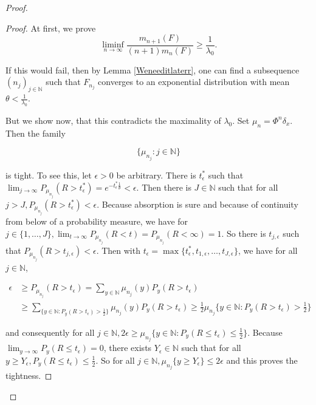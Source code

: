 \documentclass[12pt,a4paper]{scrartcl}
\numberwithin{equation}{section}
\newcommand{\N}{\mathbb{N}} %
\begin{document}
\begin{proof}
\begin{proof}
At first, we prove
\begin{equation}
\liminf_{n \to \infty} \frac{m_{n+1}\left(F\right)}{\left(n+1\right) m_n\left(F\right)} \geq \frac{1}{\lambda_0}.
\label{eq:inbetweenresult}
\end{equation}

If this would fail, then by Lemma \ref{Weneeditlaterr}, one can find a subsequence $ \left(n_j\right)_{j \in \N} $ such that $ F_{n_j} $ converges to an exponential distribution with mean $ \theta < \frac{1}{\lambda_0} $.

But we show now, that this contradicts the maximality of $ \lambda_0 $. Set $ \mu_n = \Phi^n \delta_x $. Then the family

\begin{equation}
\lbrace  \mu_{n_j} : j \in \N \rbrace 
\end{equation}

is tight. To see this, let $ \epsilon > 0 $ be arbitrary. There is $t_{\epsilon}^{\ast}$ such that $ \lim_{j \to \infty} P_{\mu_{n_j}}\left(R > t_{\epsilon}^{\ast}\right) = e^{-t_{\epsilon}^{\ast} \frac{1}{\theta}} < \epsilon $. Then there is $ J \in \N $ such that for all $ j > J , P_{\mu_{n_j}}\left(R > t_{\epsilon}^{\ast}\right) < \epsilon $. Because absorption is sure and because of continuity from below of a probability measure, we have for $ j \in \lbrace 1,\ldots, J\rbrace  , \lim_{t \to \infty} P_{\mu_{n_j}}\left(R < t\right) = P_{\mu_{n_j}}\left(R < \infty\right) = 1 $. So there is $ t_{j,\epsilon} $ such that $ P_{\mu_{n_j}}\left(R > t_{j,\epsilon}\right) < \epsilon $. Then with $t_{\epsilon} = \max\lbrace t_{\epsilon}^{\ast}, t_{1,\epsilon}, \ldots , t_{J,\epsilon}\rbrace  $, we have for all $j \in \N$,

\begin{align*}
\epsilon &\geq P_{\mu_{n_j}}\left(R > t_{\epsilon}\right) = \sum_{y \in \N} \mu_{n_j}\left(y\right) P_y\left(R > t_{\epsilon}\right) \\
&\geq \sum_{\lbrace y \in \N : P_y\left(R > t_{\epsilon}\right) > \frac{1}{2}\rbrace } \mu_{n_j}\left(y\right) P_y\left(R > t_{\epsilon}\right) \geq \frac{1}{2} \mu_{n_j}\lbrace y \in \N : P_y\left(R > t_{\epsilon}\right) > \frac{1}{2}\rbrace 
\end{align*}

and consequently for all $j \in \N, 2\epsilon \geq \mu_{n_j}\lbrace y \in \N : P_y\left(R \leq t_{\epsilon}\right) \leq \frac{1}{2}\rbrace $. Because $\lim_{y \to \infty} P_y\left(R \leq t_{\epsilon}\right) = 0$, there exists $Y_{\epsilon} \in \N$ such that for all $ y \geq Y_{\epsilon}, P_y\left(R \leq t_{\epsilon}\right) \leq \frac{1}{2}$. So for all $ j \in \N, \mu_{n_j}\lbrace y \geq Y_{\epsilon} \rbrace  \leq 2 \epsilon $ and this proves the tightness.


\end{proof}
\end{proof}
\end{document}

